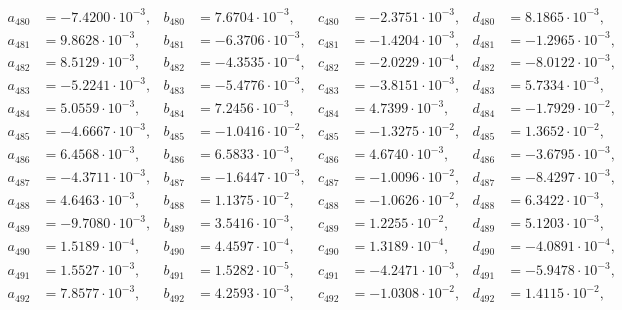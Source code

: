 \begin{align*}
  a_{ 480 } &= -7.4200 \cdot 10^{ -3 }, & b_{ 480 } &= 7.6704 \cdot 10^{ -3 }, & c_{ 480 } &= -2.3751 \cdot 10^{ -3 }, & d_{ 480 } &= 8.1865 \cdot 10^{ -3 }, \\ 
  a_{ 481 } &= 9.8628 \cdot 10^{ -3 }, & b_{ 481 } &= -6.3706 \cdot 10^{ -3 }, & c_{ 481 } &= -1.4204 \cdot 10^{ -3 }, & d_{ 481 } &= -1.2965 \cdot 10^{ -3 }, \\ 
  a_{ 482 } &= 8.5129 \cdot 10^{ -3 }, & b_{ 482 } &= -4.3535 \cdot 10^{ -4 }, & c_{ 482 } &= -2.0229 \cdot 10^{ -4 }, & d_{ 482 } &= -8.0122 \cdot 10^{ -3 }, \\ 
  a_{ 483 } &= -5.2241 \cdot 10^{ -3 }, & b_{ 483 } &= -5.4776 \cdot 10^{ -3 }, & c_{ 483 } &= -3.8151 \cdot 10^{ -3 }, & d_{ 483 } &= 5.7334 \cdot 10^{ -3 }, \\ 
  a_{ 484 } &= 5.0559 \cdot 10^{ -3 }, & b_{ 484 } &= 7.2456 \cdot 10^{ -3 }, & c_{ 484 } &= 4.7399 \cdot 10^{ -3 }, & d_{ 484 } &= -1.7929 \cdot 10^{ -2 }, \\ 
  a_{ 485 } &= -4.6667 \cdot 10^{ -3 }, & b_{ 485 } &= -1.0416 \cdot 10^{ -2 }, & c_{ 485 } &= -1.3275 \cdot 10^{ -2 }, & d_{ 485 } &= 1.3652 \cdot 10^{ -2 }, \\ 
  a_{ 486 } &= 6.4568 \cdot 10^{ -3 }, & b_{ 486 } &= 6.5833 \cdot 10^{ -3 }, & c_{ 486 } &= 4.6740 \cdot 10^{ -3 }, & d_{ 486 } &= -3.6795 \cdot 10^{ -3 }, \\ 
  a_{ 487 } &= -4.3711 \cdot 10^{ -3 }, & b_{ 487 } &= -1.6447 \cdot 10^{ -3 }, & c_{ 487 } &= -1.0096 \cdot 10^{ -2 }, & d_{ 487 } &= -8.4297 \cdot 10^{ -3 }, \\ 
  a_{ 488 } &= 4.6463 \cdot 10^{ -3 }, & b_{ 488 } &= 1.1375 \cdot 10^{ -2 }, & c_{ 488 } &= -1.0626 \cdot 10^{ -2 }, & d_{ 488 } &= 6.3422 \cdot 10^{ -3 }, \\ 
  a_{ 489 } &= -9.7080 \cdot 10^{ -3 }, & b_{ 489 } &= 3.5416 \cdot 10^{ -3 }, & c_{ 489 } &= 1.2255 \cdot 10^{ -2 }, & d_{ 489 } &= 5.1203 \cdot 10^{ -3 }, \\ 
  a_{ 490 } &= 1.5189 \cdot 10^{ -4 }, & b_{ 490 } &= 4.4597 \cdot 10^{ -4 }, & c_{ 490 } &= 1.3189 \cdot 10^{ -4 }, & d_{ 490 } &= -4.0891 \cdot 10^{ -4 }, \\ 
  a_{ 491 } &= 1.5527 \cdot 10^{ -3 }, & b_{ 491 } &= 1.5282 \cdot 10^{ -5 }, & c_{ 491 } &= -4.2471 \cdot 10^{ -3 }, & d_{ 491 } &= -5.9478 \cdot 10^{ -3 }, \\ 
  a_{ 492 } &= 7.8577 \cdot 10^{ -3 }, & b_{ 492 } &= 4.2593 \cdot 10^{ -3 }, & c_{ 492 } &= -1.0308 \cdot 10^{ -2 }, & d_{ 492 } &= 1.4115 \cdot 10^{ -2 }, \\ 

\end{align*}
